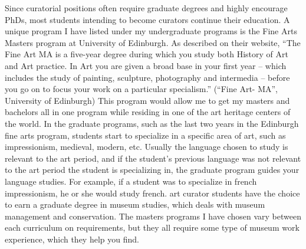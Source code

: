 \begin{multicols}{2}
	Since curatorial positions often require graduate degrees and highly encourage PhDs, most students intending to become curators continue their education. A unique program I have listed under my undergraduate programs is the Fine Arts Masters program at University of Edinburgh. As described on their website, “The Fine Art MA is a five-year degree during which you study both History of Art and Art practice. In Art you are given a broad base in your first year – which includes the study of painting, sculpture, photography and intermedia – before you go on to focus your work on a particular specialism.” (“Fine Art- MA”, University of Edinburgh) This program would allow me to get my masters and bachelors all in one program while residing in one of the art heritage centers of the world. In the graduate programs, such as the last two years in the Edinburgh fine arts program, students start to specialize in a specific area of art, such as impressionism, medieval, modern, etc. Usually the language chosen to study is relevant to the art period, and if the student’s previous language was not relevant to the art period the student is specializing in, the graduate program guides your language studies. For example, if a student was to specialize in french impressionism, he or she would study french. art curator students have the choice to earn a graduate degree in museum studies, which deals with museum management and conservation. The masters programs I have chosen vary between each curriculum on requirements, but they all require some type of museum work experience, which they help you find. 


\end{multicols}
